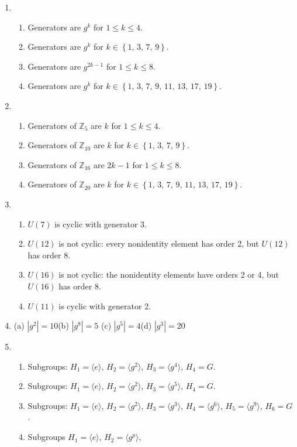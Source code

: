 \documentclass[12pt]{article}
\newcommand{\order}[1]{\ensuremath{|#1|}}
\newcommand{\units}[1]{\ensuremath{U(#1)}}
\newcommand{\<}{\ensuremath{\langle}}
\renewcommand{\>}{\ensuremath{\rangle}}
\newcommand{\Z} {{\mathbb Z}}
\newcommand{\set}[1]{\left\{#1\right\}}
\theoremstyle{plain}
\theoremstyle{definition}
\begin{document}
\begin{enumerate}
\item \begin{enumerate}
\item Generators are $g^k$ for $1\le k\le 4$.
\item Generators are $g^k$ for $k\in\set{1,\,3,\,7,\,9}$.
\item Generators are $g^{2k-1}$ for $1\le k\le 8$.
\item Generators are $g^k$ for $k\in\set{1,\,3,\,7,\,9,\,11,\,13,\,17,\,19}$.
\end{enumerate}
\item \begin{enumerate}
\item Generators of $\Z_5$ are $k$ for $1\le k\le 4$.
\item Generators of $\Z_{10}$ are $k$ for $k\in\set{1,\,3,\,7,\,9}$.
\item Generators of $\Z_{16}$ are $2k-1$ for $1\le k\le 8$.
\item Generators of $\Z_{20}$ are $k$ for $k\in\set{1,\,3,\,7,\,9,\,11,\,13,\,17,\,19}$.
\end{enumerate}
\item \begin{enumerate}
\item $\units{7}$ is cyclic with generator 3.
\item $\units{12}$ is not cyclic: every nonidentity element has order 2, but
$\units{12}$ has order 8.
\item $\units{16}$ is not cyclic: the nonidentity elements have orders 2 or 4, but $\units{16}$ has order 8.
\item $\units{11}$ is cyclic with generator 2.
\end{enumerate}
\item
(a) $\order{g^2}=10$\qquad (b) $\order{g^8}=5$ \qquad (c) $\order{g^5}=4$\qquad (d)
$\order{g^3}=20$
\item \begin{enumerate}
\item Subgroups:  $H_1=\langle e\rangle$, $H_2=\langle g^2\rangle$,
$H_3=\langle g^4\rangle$, $H_4=G$.
\item Subgroups: $H_1=\langle e\rangle$, $H_2=\langle g^2\rangle$,
$H_3=\langle g^5\rangle$, $H_4=G$.
\item Subgroups: $H_1=\langle e\rangle$, $H_2=\langle g^2\rangle$,
$H_3=\langle g^3\rangle$, $H_4=\langle g^6\rangle$, 
$H_5=\langle g^9\rangle $, $H_6=G$.
\item Subgroups $H_1=\langle e\rangle$, $H_2=\langle g^p\rangle$,

\end{enumerate}
\end{enumerate}
\end{document}
